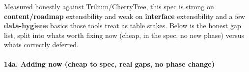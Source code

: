 Measured honestly against Trilium/CherryTree, this spec is strong on
\textbf{content/roadmap} extensibility and weak on \textbf{interface}
extensibility and a few \textbf{data-hygiene} basics those tools treat
as table stakes. Below is the honest gap list, split into
what\textquotesingle s worth fixing now (cheap, in the spec, no new
phase) versus what\textquotesingle s correctly deferred.

\hypertarget{spec-v3-public-release-14a-adding-now-cheap-to-spec-real-gaps-no-phase-change}{%
\paragraph{14a. Adding now (cheap to spec, real gaps, no phase
change)}\label{spec-v3-public-release-14a-adding-now-cheap-to-spec-real-gaps-no-phase-change}}


